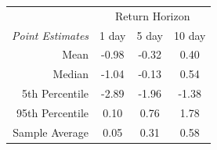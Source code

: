 \begin{tabular}{r | c c c}
\toprule 
& \multicolumn{3}{c}{Return Horizon} \\
\multicolumn{1}{l|}{\textit{Point Estimates}} & 1 day & 5 day & 10 day \\
\midrule 
Mean & -0.98 & -0.32 & 0.40 \\
Median & -1.04 & -0.13 & 0.54 \\
5th Percentile & -2.89 & -1.96 & -1.38 \\
95th Percentile & 0.10 & 0.76 & 1.78 \\
\midrule \midrule
Sample Average & 0.05 & 0.31 & 0.58 \\
\bottomrule
\end{tabular}